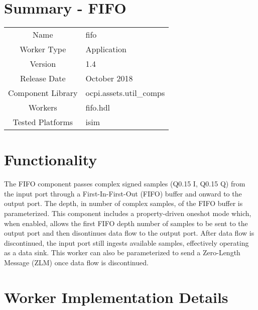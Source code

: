 \documentclass{article}
\author{} %
\date{Version \docVersion} %
\title{\docTitle}
\def\docVersion{1.4}
\def\comp{fifo}
\def\Comp{FIFO}
\begin{document}
\section*{Summary - \Comp}
\begin{tabular}{|c|M{13.5cm}|}
  \hline
                    &                                                              \\
  \hline
  Name              & \comp                                                        \\
  \hline
  Worker Type       & Application                                                  \\
  \hline
  Version           & \docVersion                                                 \\
  \hline
  Release Date      & October 2018                                              \\
  \hline
  Component Library & ocpi.assets.util\_comps                                        \\
  \hline
  Workers           & \comp.hdl                                                    \\
  \hline
  Tested Platforms  & isim \\
  \hline
\end{tabular}

\section*{Functionality}
\begin{flushleft}
  The FIFO component passes complex signed samples (Q0.15 I, Q0.15 Q) from the input port through a First-In-First-Out (FIFO) buffer and onward to the output port. The depth, in number of complex samples, of the FIFO buffer is parameterized. This component includes a property-driven oneshot mode which, when enabled, allows the first FIFO depth number of samples to be sent to the output port and then disontinues data flow to the output port. After data flow is discontinued, the input port still ingests available samples, effectively operating as a data sink. This worker can also be parameterized to send a Zero-Length Message (ZLM) once data flow is discontinued.
\end{flushleft}

\section*{Worker Implementation Details}
\end{document}
